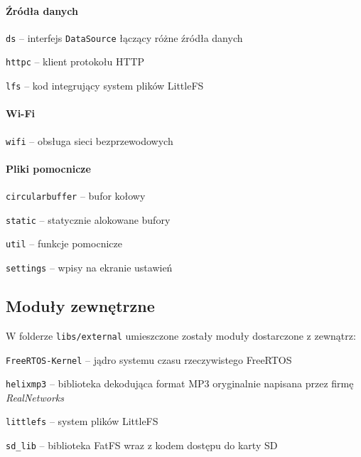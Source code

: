\documentclass[polish]{aghengthesis}
\let\tempone\itemize
\let\temptwo\enditemize
\renewenvironment{itemize}{\tempone\setlength{\itemsep}{0cm}}{\temptwo}
\begin{document}
			\paragraph{Źródła danych}
				\begin{itemize}
					\item \lstinline|ds| -- interfejs \lstinline|DataSource| łączący różne źródła danych
					\item \lstinline|httpc| -- klient protokołu HTTP
					\item \lstinline|lfs| -- kod integrujący system plików LittleFS\textsuperscript{\cite{littlefs}}
				\end{itemize}
			
			\paragraph{Wi-Fi}
				\begin{itemize}
					\item \lstinline|wifi| -- obsługa sieci bezprzewodowych
				\end{itemize}
		
			\paragraph{Pliki pomocnicze}
				\begin{itemize}
					\item \lstinline|circularbuffer| -- bufor kołowy
					\item \lstinline|static| -- statycznie alokowane bufory
					\item \lstinline|util| -- funkcje pomocnicze
					\item \lstinline|settings| -- wpisy na ekranie ustawień
				\end{itemize}
	
		\subsection{Moduły zewnętrzne}
		W folderze \lstinline|libs/external| umieszczone zostały moduły dostarczone z zewnątrz:
		\begin{itemize}
			\item \lstinline|FreeRTOS-Kernel| -- jądro systemu czasu rzeczywistego FreeRTOS\textsuperscript{\cite{freertos_kernel}}
			\item \lstinline|helixmp3| -- biblioteka dekodująca format MP3\textsuperscript{\cite{helixmp3_repo}} oryginalnie napisana przez firmę \textit{RealNetworks}\textsuperscript{\cite{realnetworks}}
			\item \lstinline|littlefs| -- system plików LittleFS\textsuperscript{\cite{littlefs}}
			\item \lstinline|sd_lib| -- biblioteka FatFS\textsuperscript{\cite{fatfs}} wraz z kodem dostępu do karty SD\textsuperscript{\cite{sdfs}}
		\end{itemize}
\end{document}
